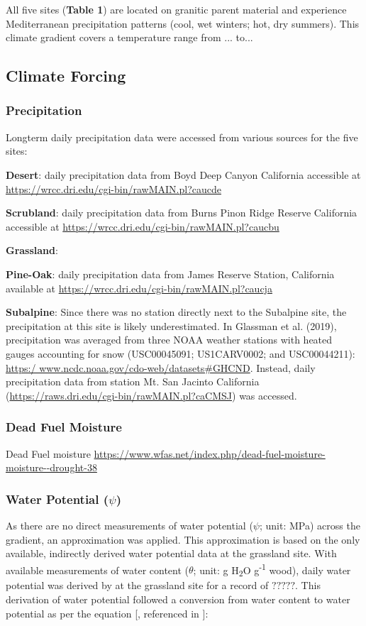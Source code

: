 \documentclass[letterpaper, 10pt]{article}
\begin{document}
All five sites (\textbf{Table 1}) are located on granitic parent material and experience Mediterranean precipitation
patterns (cool, wet winters; hot, dry summers). This climate gradient covers a temperature range from ... to...



\subsection{\large Climate Forcing}

\subsubsection{Precipitation}
Longterm daily precipitation data were accessed from various sources for the five sites:

\textbf{Desert}: daily precipitation data from Boyd Deep Canyon California accessible at \url{https://wrcc.dri.edu/cgi-bin/rawMAIN.pl?caucde}

\textbf{Scrubland}: daily precipitation data from Burns Pinon Ridge Reserve California accessible at \url{https://wrcc.dri.edu/cgi-bin/rawMAIN.pl?caucbu}

\textbf{Grassland}:

\textbf{Pine-Oak}: daily precipitation data from James Reserve Station, California available at \url{https://wrcc.dri.edu/cgi-bin/rawMAIN.pl?caucja}

\textbf{Subalpine}: Since there was no station directly next to the Subalpine site, the precipitation at this site is likely
underestimated. In Glassman et al. (2019), precipitation was averaged from three NOAA weather stations with
heated gauges accounting for snow (USC00045091; US1CARV0002; and USC00044211): \url{https:/
www.ncdc.noaa.gov/cdo-web/datasets#GHCND}. Instead, daily precipitation data from station Mt. San Jacinto
California (\url{https://raws.dri.edu/cgi-bin/rawMAIN.pl?caCMSJ}) was accessed.

\subsubsection{Dead Fuel Moisture}

Dead Fuel moisture \url{https://www.wfas.net/index.php/dead-fuel-moisture-moisture--drought-38}


\subsubsection{Water Potential ($\psi$)}
As there are no direct measurements of water potential ($\psi$; unit: MPa) across the gradient, an approximation
was applied. This approximation is based on the only available, indirectly derived water potential data at the
grassland site. With available measurements of water content ($\theta$; unit: g H\textsubscript{2}O
g\textsuperscript{-1} wood), daily water potential was derived by \citet{allison2017consequences} at the grassland
site for a record of $?????$. This derivation of water potential followed a conversion from water content to water
potential as per the equation [\citet{dix1985changes}, referenced in \citet{allison2017consequences}]:
\end{document}
